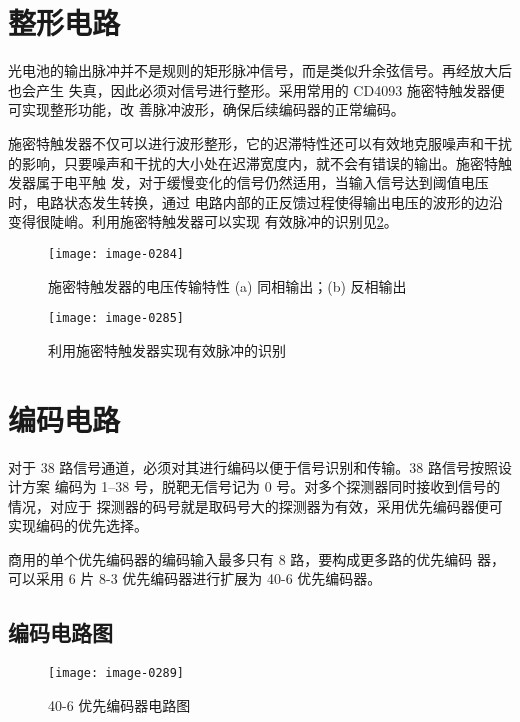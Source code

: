 \clearpage
\vspace*{-1.5em}
\section{整形电路\cite{cn11}}

光电池的输出脉冲并不是规则的矩形脉冲信号，而是类似升余弦信号。再经放大后也会产生
失真，因此必须对信号进行整形。采用常用的 CD4093 施密特触发器便可实现整形功能，改
善脉冲波形，确保后续编码器的正常编码。

施密特触发器不仅可以进行波形整形，它的迟滞特性还可以有效地克服噪声和干扰的影响，只要噪声和干扰的大小处在迟滞宽度内，就不会有错误的输出。施密特触发器属于电平触
发，对于缓慢变化的信号仍然适用，当输入信号达到阈值电压时，电路状态发生转换，通过
电路内部的正反馈过程使得输出电压的波形的边沿变得很陡峭。利用施密特触发器可以实现
有效脉冲的识别见\cref{4-5}。

\begin{figure}[htbp]
  \centering
  \texttt{[image: image-0284]}
  \caption{施密特触发器的电压传输特性 (a) 同相输出；(b) 反相输出}
  \label{4-4}
\end{figure}

\begin{figure}[htbp]
  \centering
  \texttt{[image: image-0285]}
  \caption{利用施密特触发器实现有效脉冲的识别}
  \label{4-5}
\end{figure}

\section{编码电路\cite{cn11}}

对于 38 路信号通道，必须对其进行编码以便于信号识别和传输。38 路信号按照设计方案
编码为 1--38 号，脱靶无信号记为 0 号。对多个探测器同时接收到信号的情况，对应于
探测器的码号就是取码号大的探测器为有效，采用优先编码器便可实现编码的优先选择。

商用的单个优先编码器的编码输入最多只有 8 路，要构成更多路的优先编码
器，可以采用 6 片 8-3 优先编码器进行扩展为 40-6 优先编码器。

\subsection{编码电路图}

\begin{figure}[htbp]
  \centering
  \texttt{[image: image-0289]}
  \caption{40-6 优先编码器电路图}
  \label{4-6}
\end{figure}

